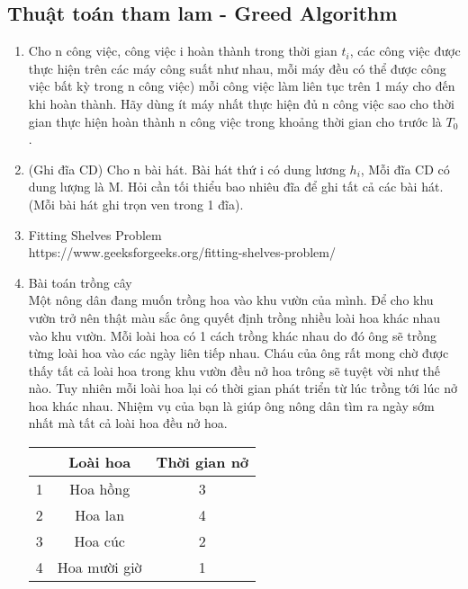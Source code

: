 \documentclass[12pt,a4paper]{article}
\begin{document}
\subsection{Thuật toán tham lam - Greed Algorithm}
\begin{enumerate}
	\item Cho n công việc, công việc i hoàn thành trong thời gian $t_i$, các công việc được thực hiện trên các máy công suất như nhau, mỗi máy đều có thể được công việc bất kỳ trong n công việc) mỗi công việc làm liên tục trên 1 máy cho đến khi hoàn thành. Hãy dùng ít máy nhất thực hiện đủ n công việc sao cho thời gian thực hiện hoàn thành n công việc trong khoảng thời gian cho trước là $T_0$.
	\item (Ghi đĩa CD) Cho n bài hát. Bài hát thứ i có dung lương $h_i$, Mỗi đĩa CD có dung lượng là M. Hỏi cần tối thiểu bao nhiêu đĩa để ghi tất cả các bài hát. (Mỗi bài hát ghi trọn ven trong 1 đĩa).	
	\item Fitting Shelves Problem \\
	https://www.geeksforgeeks.org/fitting-shelves-problem/
	\item Bài toán trồng cây \\
	Một nông dân đang muốn trồng hoa vào khu vườn của mình. Để cho khu vườn trở nên thật màu sắc ông quyết định trồng nhiều loài hoa khác nhau vào khu vườn. Mỗi loài hoa có 1 cách trồng khác nhau do đó ông sẽ trồng từng loài hoa vào các ngày liên tiếp nhau. Cháu của ông rất mong chờ được thấy tất cả loài hoa trong khu vườn đều nở hoa trông sẽ tuyệt vời như thế nào. Tuy nhiên mỗi loài hoa lại có thời gian phát triển từ lúc trồng tới lúc nở hoa khác nhau. Nhiệm vụ của bạn là giúp ông nông dân tìm ra ngày sớm nhất mà tất cả loài hoa đều nở hoa.\\
\begin{center}
	\begin{tabular}{|c|c|c|}
		\hline
		& Loài hoa & Thời gian nở \\
		\hline
		1 & Hoa hồng & 3 \\
		\hline
		2 & Hoa lan & 4 \\
		\hline
		3 & Hoa cúc & 2 \\
		\hline
		4 & Hoa mười giờ & 1 \\
		\hline
	\end{tabular}
\end{center}
\end{enumerate}
	
	
\end{document}
